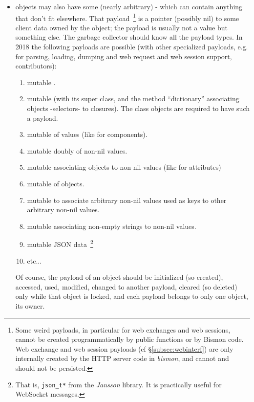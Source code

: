 \begin{itemize}
      \item objects may also have some (nearly arbitrary)
         - which can contain anything
        that don't fit elsewhere. That payload~\footnote{Some weird
          payloads, in particular for web exchanges and web sessions,
          cannot be created programmatically by public functions or by
          Bismon code. Web exchange and web session payloads (cf
          §\ref{subsec:webinterf}) are only internally created by the
          HTTP server code in \emph{bismon}, and cannot and should not
          be persisted.} is a pointer (possibly nil) to some client
        data owned by the object; the payload is usually not a value
        but something else. The garbage collector should know all the
        payload types. In 2018 the following payloads are possible
        (with other specialized payloads, e.g. for parsing, loading,
        dumping and web request and web session support,
        contributors):

        \begin{enumerate}
        \item mutable .
          \item mutable  (with its super class, and
            the method ``dictionary'' associating objects -selectors-
            to closures). The class objects are required to have such
            a payload.
        \item mutable  of values (like
          for components).
        \item mutable  doubly  of non-nil values.
        \item mutable  associating objects to non-nil values (like for
          attributes)
        \item mutable  of objects.
        \item mutable  to associate arbitrary
            non-nil values used as keys to other arbitrary non-nil
            values.
        \item mutable  associating
          non-empty strings to non-nil values.
        \item mutable JSON  data~\footnote{That is, \texttt{json\_t*} from the \emph{Jansson} library. It is practically useful for WebSocket messages.} 
        \item etc...
        \end{enumerate}

        Of course, the payload of an object should be initialized (so
        created), accessed, used, modified, changed to another
        payload, cleared (so deleted) only while that object is
        locked, and each payload belongs to only one object, its
        owner.
       
\end{itemize}

